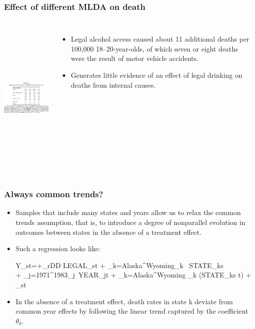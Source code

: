 \documentclass{beamer}
\begin{document}
\begin{frame}
\frametitle{Effect of different MLDA on death}
	
\begin{columns}
\includegraphics[width=6.3cm,height=7.5cm,keepaspectratio]{Table 5.2} 

\begin{itemize}
	\item Legal alcohol access caused about 11 additional deaths per 100,000 18–20-year-olds, of which seven or eight deaths were the result of motor vehicle accidents.
	\item Generates little evidence of an effect of legal drinking on deaths from internal causes.
\end{itemize}

\end{columns}


\end{frame}




\begin{frame}
\frametitle{Always common trends?}
	\begin{itemize}
		\item Samples that include many states and years allow us to relax the common trends assumption, that is, to introduce a degree of nonparallel evolution in outcomes between states in the absence of a treatment effect.
		\item Such a regression looks like: 
		\begin{flalign*}
	Y_{st}=\alpha +\sigma_{rDD} LEGAL_{st} + \sum_{k=Alaska}^{Wyoming}\beta_k~ STATE_{ks} \\
				+ \sum_{j=1971}^{1983}\gamma_j~YEAR_{jt} + \sum_{k=Alaska}^{Wyoming} \theta_k (STATE_{ks} \times t) + \epsilon_{st}
		\end{flalign*}
		\item In the absence of a treatment effect, death rates in state k deviate from common year effects by following the linear trend captured by the coefficient $\theta_k$.

	\end{itemize}

\end{frame}
\end{document}
